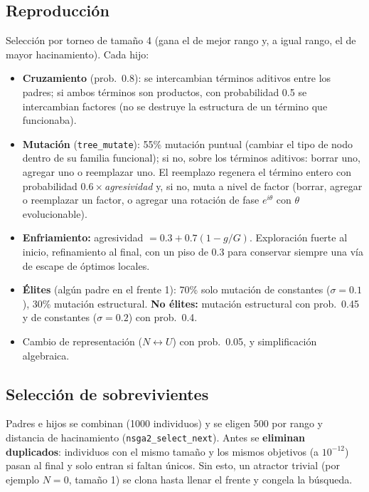 \documentclass[11pt,a4paper]{article}
\newcommand{\code}[1]{\texttt{\small #1}}
\begin{document}
\subsection{Reproducción}
Selección por torneo de tamaño 4 (gana el de mejor rango y, a igual rango, el de mayor hacinamiento).
Cada hijo:
\begin{itemize}
\item \textbf{Cruzamiento} (prob.\ 0.8): se intercambian términos aditivos entre los padres; si ambos
  términos son productos, con probabilidad 0.5 se intercambian factores (no se destruye la estructura de
  un término que funcionaba).
\item \textbf{Mutación} (\code{tree\_mutate}): 55\% mutación puntual (cambiar el tipo de nodo dentro de su
  familia funcional); si no, sobre los términos aditivos: borrar uno, agregar uno o reemplazar uno.
  El reemplazo regenera el término entero con probabilidad $0.6\times$\emph{agresividad} y, si no, muta
  a nivel de factor (borrar, agregar o reemplazar un factor, o agregar una rotación de fase
  $e^{i\theta}$ con $\theta$ evolucionable).
\item \textbf{Enfriamiento:} agresividad $=0.3+0.7(1-g/G)$. Exploración fuerte al inicio, refinamiento al
  final, con un piso de 0.3 para conservar siempre una vía de escape de óptimos locales.
\item \textbf{Élites} (algún padre en el frente 1): 70\% solo mutación de constantes ($\sigma=0.1$),
  30\% mutación estructural. \textbf{No élites:} mutación estructural con prob.\ 0.45 y de constantes
  ($\sigma=0.2$) con prob.\ 0.4.
\item Cambio de representación ($N\leftrightarrow U$) con prob.\ 0.05, y simplificación algebraica.
\end{itemize}

\subsection{Selección de sobrevivientes}
Padres e hijos se combinan (1000 individuos) y se eligen 500 por rango y distancia de hacinamiento
(\code{nsga2\_select\_next}). Antes se \textbf{eliminan duplicados}: individuos con el mismo tamaño y los
mismos objetivos (a $10^{-12}$) pasan al final y solo entran si faltan únicos. Sin esto, un atractor
trivial (por ejemplo $N=0$, tamaño 1) se clona hasta llenar el frente y congela la búsqueda.
\end{document}
